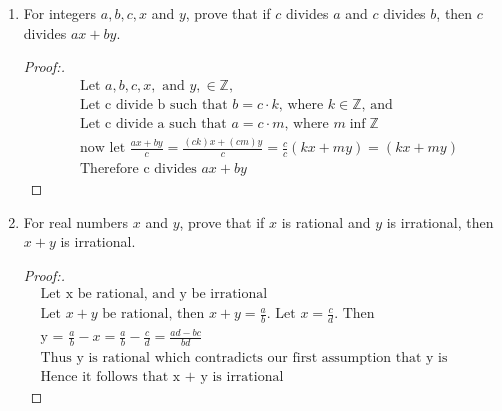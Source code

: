 \documentclass[11pt]{article}
\begin{document}
\begin{enumerate}
\begin{proof}[Proof:\nopunct]
           Now let $n=3k+2$
           \begin{align*}
               \text{Then, } n^3-n & = (3k+2)^3+(3k+2) \\
                                & = (9k^2+12k+4)(3k+2) - (3k+2) \\
                                & = (27k^3+36k^2+12k+18k^2+24k+9-3k-2 \\
                                & = 27k^3+54k^2+33k+6 \\
                                & = 3(9k^3+18k^2+11k+2) \\
                                & = (9k^3+18k^2+11k+2) \in \mathbb{Z} \text{, and} \\
                                & = 3(9k^3+18k^2+11k+2) \text{ is divisible by 3.}
           \end{align*}
           
           Therefore for any integer $n = 3k,$ $ n = 3k+1, \text{ or }n=3k+2$, $n$ is divisible by 3.
            
        \end{proof}
        
    \item For integers $a,b,c,x$ and $y$, prove that if $c$ divides $a$ and $c$ divides $b$, then $c$ divides $ax+by$.
        \begin{proof}[Proof:\nopunct]
        \begin{align*}
            & \text{Let $a,b,c,x,  \text{ and } y, \in \mathbb{Z}$,} \\
            & \text{Let c divide b such that $b=c \cdot k$, where $k \in \mathbb{Z}$, and} \\
            & \text{Let c divide a such that $a=c \cdot m$, where $m \inf \mathbb{Z}$} \\
            & \text{now let $\frac{ax+by}{c}=\frac{(ck)x+(cm)y}{c}=\frac{c}{c}(kx+my)=(kx+my)$} \\
            & \text{Therefore c divides $ax+by$}
        \end{align*}
        \end{proof}
        
    \item For real numbers $x$ and $y$, prove that if $x$ is rational and $y$ is irrational, then $x + y$ is irrational. 
        \begin{proof}[Proof:\nopunct]
            \begin{align*}
                &\text{Let x be rational, and y be irrational} \\
                & \text{Let $x+y$} \text{ be rational, then $x+y=\frac{a}{b}$. Let $x=\frac{c}{d}$. Then} \\
                & \text{y = $\frac{a}{b} - x=\frac{a}{b}-\frac{c}{d}=\frac{ad-bc}{bd}$} \\
                & \text{Thus y is rational which contradicts our first assumption that y is irrational.} \\ & \text{Hence it follows that x + y is irrational}
            \end{align*}
        \end{proof}
        

\end{enumerate}
\end{document}
